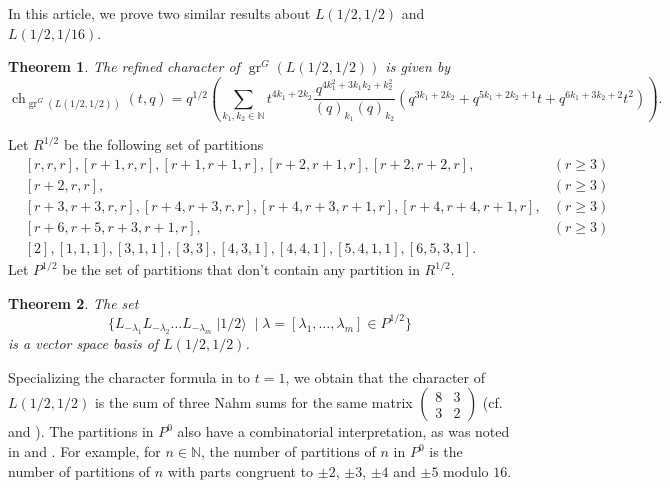 \documentclass[a4paper, 12pt, reqno]{amsart}
\newtheorem{theorem}{Theorem}[section]
\theoremstyle{remark}
\DeclareMathOperator{\gr}{gr}
\DeclareMathOperator{\ch}{ch}
\DeclareMathOperator{\vachalf}{|1/2\rangle}
\begin{document}
In this article, we prove two similar results about $L(1/2,1/2)$ and $L(1/2, 1/16)$.

\begin{theorem}
  \label{thr:3}
  The refined character of $\gr^G(L(1/2, 1/2))$ is given by
  \begin{equation*}
    \ch_{\gr^G(L(1/2, 1/2))}(t, q) = q^{1/2}\left(\sum_{k_1, k_2 \in \mathbb{N}}t^{4k_1 + 2k_2}\frac{q^{4k_1^2 + 3k_1k_2 + k_2^2}}{(q)_{k_1}(q)_{k_2}}(q^{3k_1 + 2k_2} + q^{5k_1 + 2k_2 + 1}t + q^{6k_1 + 3k_2 + 2}t^2)\right).
  \end{equation*}
\end{theorem}

Let $R^{1/2}$ be the following set of partitions
\begin{align*}
  &[r, r, r], [r + 1, r, r], [r + 1, r + 1, r], [r + 2, r + 1, r], [r + 2, r + 2, r], &(r \ge 3) \\
  &[r + 2, r, r], &(r \ge 3) \\
  &[r + 3, r + 3, r, r], [r + 4, r + 3, r, r],  [r + 4, r + 3, r + 1, r], [r + 4, r + 4, r + 1, r], &(r \ge 3)\\
  &[r + 6, r + 5, r + 3, r + 1, r], &(r \ge 3) \\
  &[2], [1, 1, 1], [3, 1, 1], [3, 3], [4, 3, 1], [4, 4, 1], [5, 4, 1, 1], [6, 5, 3, 1].
\end{align*}
Let $P^{1/2}$ be the set of partitions that don't contain any partition in $R^{1/2}$.

\begin{theorem}
  \label{thr:4}
  The set
  \begin{equation*}
    \{L_{-\lambda_1}L_{-\lambda_2}\dots L_{-\lambda_m}\vachalf \mid \lambda = [\lambda_1, \dots, \lambda_m] \in P^{1/2}\}
  \end{equation*}
  is a vector space basis of $L(1/2, 1/2)$.
\end{theorem}

Specializing the character formula in  to $t = 1$, we obtain that the character of $L(1/2, 1/2)$ is the sum of three Nahm sums for the same matrix $\left(\begin{smallmatrix} 8 & 3 \\ 3 & 2 \end{smallmatrix}\right)$ (cf.\ \cite{Nahm2007} and \cite{andrews_singular_2022}).
The partitions in $P^0$ also have a combinatorial interpretation, as was noted in \cite{andrews_singular_2022} and \cite{tsuchioka_vertex_2023}.
For example, for $n \in \mathbb{N}$, the number of partitions of $n$ in $P^0$ is the number of partitions of $n$ with parts congruent to $\pm 2$, $\pm 3$, $\pm 4$ and $\pm 5$ modulo $16$.
\end{document}
